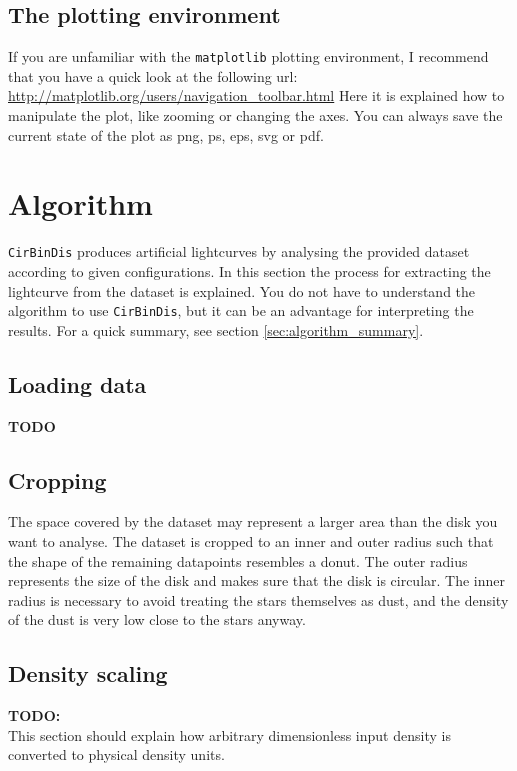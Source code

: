 \documentclass[a4paper, 12pt, english, titlepage]{article}
\newcommand{\sname}{\texttt{CirBinDis}\xspace}
\begin{document}
\subsection{The plotting environment}
    \label{sec:matplotlib}
    If you are unfamiliar with the \texttt{matplotlib} plotting environment, I recommend that you have a quick look at the following url: \url{http://matplotlib.org/users/navigation_toolbar.html}
    Here it is explained how to manipulate the plot, like zooming or changing the axes.
    You can always save the current state of the plot as png, ps, eps, svg or pdf.



\section{Algorithm}

\sname produces artificial lightcurves by analysing the provided dataset according to given configurations. In this section the process for extracting the lightcurve from the dataset is explained. You do not have to understand the algorithm to use \sname, but it can be an advantage for interpreting the results. For a quick summary, see section \vref{sec:algorithm_summary}.

\subsection{Loading data}
    \textbf{TODO}

\subsection{Cropping}
    The space covered by the dataset may represent a larger area than the disk you want to analyse. The dataset is cropped to an inner and outer radius such that the shape of the remaining datapoints resembles a donut. The outer radius represents the size of the disk and makes sure that the disk is circular. The inner radius is necessary to avoid treating the stars themselves as dust, and the density of the dust is very low close to the stars anyway.

\subsection{Density scaling}
    \textbf{TODO:} \\
    This section should explain how arbitrary dimensionless input density is converted to physical density units.
\end{document}
